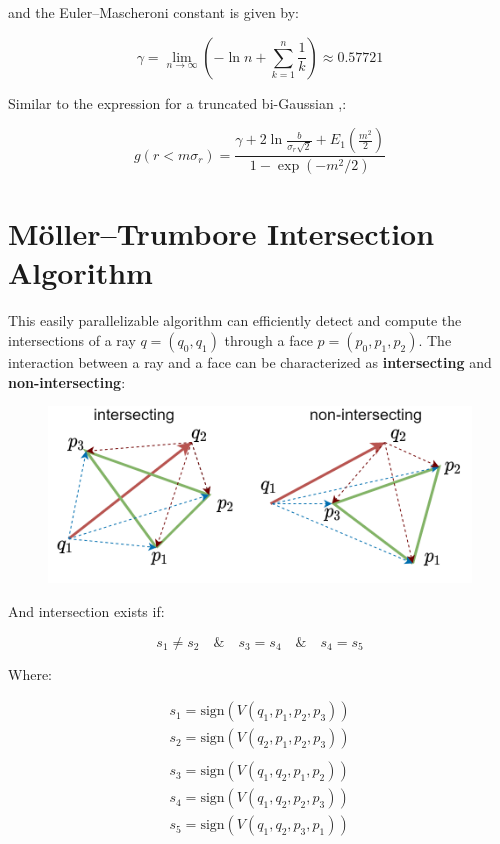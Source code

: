 and the Euler–Mascheroni constant is given by:

$$\gamma = \lim_{n\to\infty}\left(-\ln n +\sum_{k=1}^n\frac{1}{k}\right) \approx 0.57721$$

Similar to the expression for a truncated bi-Gaussian \cite{ng_physics_2006},\cite{ng_space-charge_2004}:

$$g(r<m\sigma_r) = \frac{\gamma+2\ln\frac{b}{\sigma_r\sqrt{2}}+E_1(\frac{m^2}{2})}{1-\exp(-m^2/2)}$$

\chapter{Möller–Trumbore Intersection Algorithm}

This easily parallelizable algorithm can efficiently detect and compute the intersections of a ray $q=(q_0, q_1)$ through a face $p=(p_0, p_1, p_2)$. The interaction between a ray and a face can be characterized as \textbf{intersecting} and \textbf{non-intersecting}:

\begin{figure}
    \centering
    \includegraphics{figs/moller_trumbore.drawio.png}
\end{figure}

And intersection exists if:

$$s_1 \neq s_2 \quad \& \quad s_3 = s_4 \quad \& \quad s_4 = s_5 $$

Where:

$$\begin{aligned}
    s_1 = \text{sign}(V(q_1, p_1, p_2, p_3))\\
    s_2 = \text{sign}(V(q_2, p_1, p_2, p_3))\\
    \\
    s_3 = \text{sign}(V(q_1, q_2, p_1, p_2))\\
    s_4 = \text{sign}(V(q_1, q_2, p_2, p_3))\\
    s_5 = \text{sign}(V(q_1, q_2, p_3, p_1))\\
\end{aligned}$$


